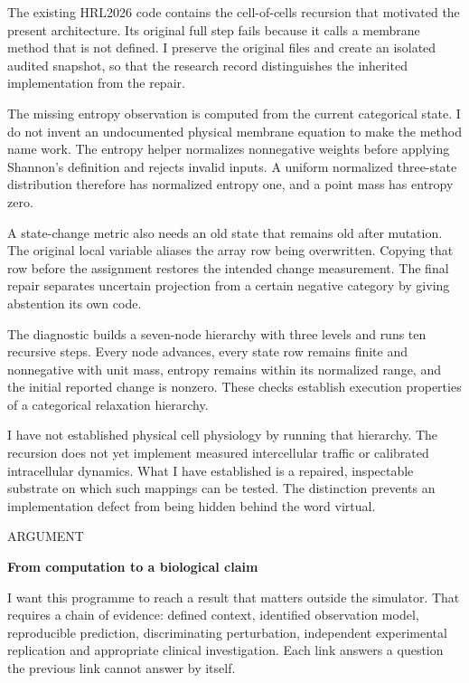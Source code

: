 \documentclass[10pt]{article}
\begin{document}
The existing HRL2026 code contains the cell-of-cells recursion that motivated the present architecture. Its original full step fails because it calls a membrane method that is not defined. I preserve the original files and create an isolated audited snapshot, so that the research record distinguishes the inherited implementation from the repair.\par
The missing entropy observation is computed from the current categorical state. I do not invent an undocumented physical membrane equation to make the method name work. The entropy helper normalizes nonnegative weights before applying Shannon's definition and rejects invalid inputs. A uniform normalized three-state distribution therefore has normalized entropy one, and a point mass has entropy zero.\par
A state-change metric also needs an old state that remains old after mutation. The original local variable aliases the array row being overwritten. Copying that row before the assignment restores the intended change measurement. The final repair separates uncertain projection from a certain negative category by giving abstention its own code.\par
The diagnostic builds a seven-node hierarchy with three levels and runs ten recursive steps. Every node advances, every state row remains finite and nonnegative with unit mass, entropy remains within its normalized range, and the initial reported change is nonzero. These checks establish execution properties of a categorical relaxation hierarchy.\par
I have not established physical cell physiology by running that hierarchy. The recursion does not yet implement measured intercellular traffic or calibrated intracellular dynamics. What I have established is a repaired, inspectable substrate on which such mappings can be tested. The distinction prevents an implementation defect from being hidden behind the word virtual.\par
\clearpage
\hypertarget{p18}{}
{\small\color{accent}\MakeUppercase{Argument}}\par
{\LARGE\bfseries\color{ink}From computation to a biological claim}\par\vspace{5pt}
I want this programme to reach a result that matters outside the simulator. That requires a chain of evidence: defined context, identified observation model, reproducible prediction, discriminating perturbation, independent experimental replication and appropriate clinical investigation. Each link answers a question the previous link cannot answer by itself.\par
\end{document}
